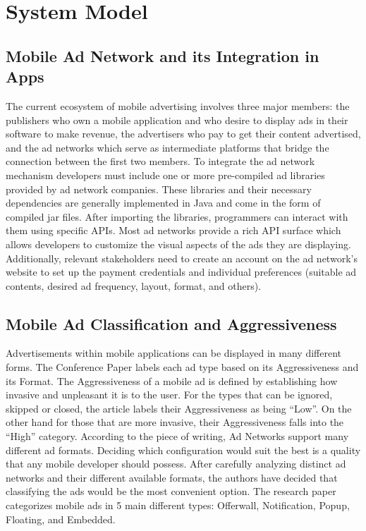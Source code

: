 \documentclass[conference]{IEEEtran}
\begin{document}
\section{System Model}
\label{SectionThree}
\subsection{Mobile Ad Network and its Integration in Apps}
The current ecosystem of mobile advertising involves three major members: the publishers who own a mobile application and who desire to display ads in their software to make revenue, the advertisers who pay to get their content advertised, and the ad networks which serve as intermediate platforms that bridge the connection between the first two members. To integrate the ad network mechanism developers must include one or more pre-compiled ad libraries provided by ad network companies. These libraries and their necessary dependencies are generally implemented in Java and come in the form of compiled jar files. After importing the libraries, programmers can interact with them using specific APIs. Most ad networks provide a rich API surface which allows developers to customize the visual aspects of the ads they are displaying. Additionally, relevant stakeholders need to create an account on the ad network’s website to set up the payment credentials and individual preferences (suitable ad contents, desired ad frequency, layout, format, and others). 

\subsection{Mobile Ad Classification and Aggressiveness}
Advertisements within mobile applications can be displayed in many different forms. The Conference Paper labels each ad type based on its Aggressiveness and its Format. The Aggressiveness of a mobile ad is defined by establishing how invasive and unpleasant it is to the user. For the types that can be ignored, skipped or closed, the article labels their Aggressiveness as being “Low”. On the other hand for those that are more invasive, their Aggressiveness falls into the “High” category. According to the piece of writing, Ad Networks support many different ad formats. Deciding which configuration would suit the best is a quality that any mobile developer should possess. After carefully analyzing distinct ad networks and their different available formats, the authors have decided that classifying the ads would be the most convenient option. The research paper categorizes mobile ads in 5 main different types: Offerwall, Notification, Popup, Floating, and Embedded.
\end{document}
